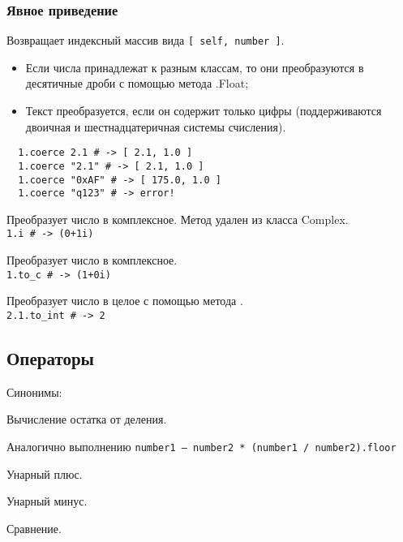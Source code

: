 \subsubsection{Явное приведение}

\begin{methodlist}
  Возвращает индексный массив вида \verb![ self, number ]!. 
  \begin{itemize}
    \item Если числа принадлежат к разным классам, то они преобразуются в десятичные дроби с помощью метода .Float;

    \item Текст преобразуется, если он содержит только цифры (поддерживаются двоичная и шестнадцатеричная системы счисления).
  \end{itemize}
  \begin{verbatim}
  1.coerce 2.1 # -> [ 2.1, 1.0 ]
  1.coerce "2.1" # -> [ 2.1, 1.0 ]
  1.coerce "0xAF" # -> [ 175.0, 1.0 ]
  1.coerce "q123" # -> error!
  \end{verbatim}

  Преобразует число в комплексное. Метод удален из класса Complex.
  \\\verb!1.i # -> (0+1i)!

  Преобразует число в комплексное. 
  \\\verb!1.to_c # -> (1+0i)!

  Преобразует число в целое с помощью метода .
  \\\verb!2.1.to_int # -> 2!
\end{methodlist}

\subsection*{Операторы}

\begin{methodlist}
  Синонимы: 

  Вычисление остатка от деления.

  Аналогично выполнению \verb!number1 – number2 * (number1 / number2).floor!

  Унарный плюс.

  Унарный минус.

  Сравнение.
\end{methodlist}

